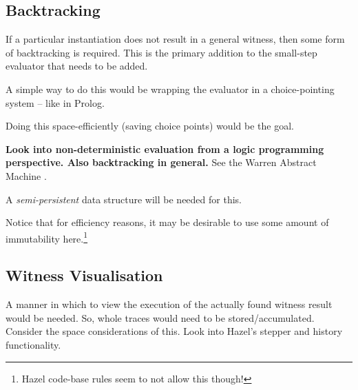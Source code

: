 \subsection{Backtracking}
If a particular instantiation does not result in a general witness, then some form of backtracking is required. This is the primary addition to the small-step evaluator that needs to be added.\par 
A simple way to do this would be wrapping the evaluator in a choice-pointing system -- like in Prolog. \par 
Doing this space-efficiently (saving choice points) would be the goal.\par 
\textbf{Look into non-deterministic evaluation from a logic programming perspective. Also backtracking in general.} See the Warren Abstract Machine \cite{WAM}.\par 
A \textit{semi-persistent} data structure \cite{SemiPersistent} will be needed for this.\par 
Notice that for efficiency reasons, it may be desirable to use some amount of immutability here.\footnote{Hazel code-base rules seem to not allow this though!}

\subsection{Witness Visualisation}
A manner in which to view the execution of the actually found witness result would be needed. So, whole traces would need to be stored/accumulated. Consider the space considerations of this. Look into Hazel's stepper and history functionality.



